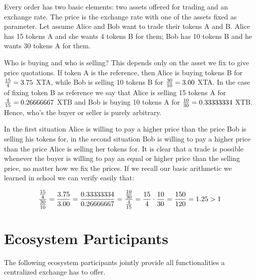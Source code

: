 \documentclass[UTF8,nofonts]{article}
\begin{document}
Every order has two basic elements: two assets offered for trading and an exchange rate. The price is the exchange rate with one of the assets fixed as parameter. Let assume Alice and Bob want to trade their tokens A and B. Alice has 15 tokens A and she wants 4 tokens B for them; Bob has 10 tokens B  and he wants 30 tokens A for them.

Who is buying and who is selling? This depends only on the asset we fix to give price quotations. If token A is the reference, then Alice is buying tokens B for ${15 \over 4} = 3.75$ XTA, while Bob is selling 10 tokens B for ${30 \over 10} = 3.00$ XTA. In the case of fixing token B as reference we say that Alice is selling 15 tokens A for ${4\over 15}=0.26666667$ XTB and Bob is buying 10 tokens A for ${10 \over 30}=0.33333334$ XTB. Hence, who's the buyer or seller is purely arbitrary.

In the first situation Alice is willing to pay a higher price than the price Bob is selling his tokens for, in the second situation Bob is willing to pay a higher price than the price Alice is selling her tokens for. It is clear that a trade is possible whenever the buyer is willing to pay an equal or higher price than the selling price, no matter how we fix the prices. If we recall our basic arithmetic we learned in school we can verify easily that:

\begin{equation}
{{15\over 4} \over {30\over 10}} = {3.75 \over 3.00}	= {0.33333334 \over 0.26666667} = {{10 \over 30} \over {4 \over 15}} = {15 \over 4} \cdot {10 \over 30} = {150 \over 120} = 1.25 > 1
\end{equation}


\section{Ecosystem Participants}
The following ecosystem participants jointly provide all functionalities a centralized exchange has to offer. 
\end{document}
